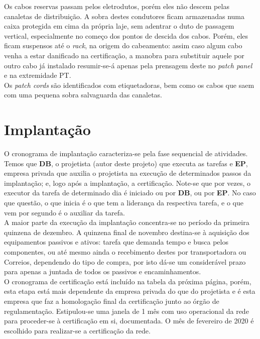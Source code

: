 \documentclass[	DIV=calc,%
							paper=a4,%
							fontsize=12pt,%
							onecolumn]{scrartcl}	 					%
\begin{document}
Os cabos reservas passam pelos eletrodutos, porém eles não descem pelas canaletas de distribuição. A sobra destes condutores ficam armazenadas numa caixa protegida em cima da própria laje, sem adentrar o duto de passagem vertical, especialmente no começo dos pontos de descida dos cabos. Porém, eles ficam suspensos até o \textit{rack}, na origem do cabeamento: assim caso algum cabo venha a estar danificado na certificação, a manobra para substituir aquele por outro cabo já instalado resumir-se-á apenas pela prensagem deste no \textit{patch panel} e na extremidade PT.
\\

Os \textit{patch cords} são identificados com etiquetadoras, bem como os cabos que saem com uma pequena sobra salvaguarda das canaletas.

\section{Implantação}

O cronograma de implantação caracteriza-se pela fase sequencial de atividades. Temos que \textbf{DB}, o projetista (autor deste projeto) que executa as tarefas e \textbf{EP}, empresa privada que auxilia o projetista na execução de determinados passos da implantação; e, logo após a implantação, a certificação. Note-se que por vezes, o executor da tarefa de determinado dia é iniciado ou por \textbf{DB}, ou por \textbf{EP}. No caso que questão, o que inicia é o que tem a liderança da respectiva tarefa, e o que vem por segundo é o auxiliar da tarefa.
\\

A maior parte da execução da implantação concentra-se no período da primeira quinzena de dezembro. A quinzena final de novembro destina-se à aquisição dos equipamentos passivos e ativos: tarefa que demanda tempo e busca pelos componentes, ou até mesmo ainda o recebimento destes por transportadora ou Correios, dependendo do tipo de compra, por isto dá-se um considerável prazo para apenas a juntada de todos os passivos e encaminhamentos.
\\

O cronograma de certificação está incluído na tabela da próxima página, porém, esta etapa está mais dependente da empresa privada do que do projetista e é esta empresa que faz a homologação final da certificação junto ao órgão de regulamentação. Estipulou-se uma janela de 1 mês com uso operacional da rede para proceder-se à certificação em si, documentada. O mês de fevereiro de 2020 é escolhido para realizar-se a certificação da rede.
\\
\end{document}
